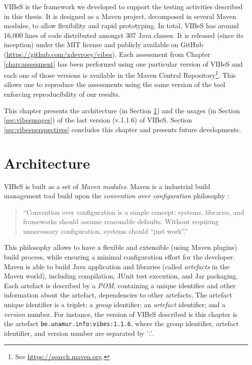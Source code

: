 

\gls{VIBeS} is the framework we developed to support the testing activities described in this thesis. It is designed as a Maven project, decomposed in several Maven modules, to allow flexibility and rapid prototyping. In total, \gls{VIBeS} has around 16,000 lines of code distributed amongst 307 Java classes. It is released (since its inception) under the MIT license and publicly available on GitHub (\url{https://github.com/xdevroey/vibes}). Each assessment from Chapter \ref{chap:assessment} has been performed using one particular version of \gls{VIBeS} and each one of those versions is available in the Maven Central Repository\footnote{See \url{https://search.maven.org}.}. This allows one to reproduce the assessments using the same version of the tool enforcing reproducibility of our results. 

This chapter presents the architecture (in Section \ref{sec:vibesarchitecture}) and the usages (in Section \ref{sec:vibesusages}) of the last version (v.1.1.6) of \gls{VIBeS}. Section \ref{sec:vibesperspectives} concludes this chapter and presents future developments.

\section{Architecture}

\label{sec:vibesarchitecture}

\gls{VIBeS} is built as a set of \emph{Maven modules}. Maven is a industrial build management tool build upon the \textit{convention over configuration} philosophy \cite{Sonatype2011}:
\begin{quote}
``Convention over configuration is a simple concept: systems, libraries, and frameworks should assume reasonable defaults. Without requiring unnecessary configuration, systems should ``just work''.''
\end{quote}
This philosophy allows to have a flexible and extensible (using Maven plugins) build process, while ensuring a minimal configuration effort for the developer. 
Maven is able to build Java application and libraries (called \emph{artefacts} in the Maven world), including compilation, JUnit test execution, and Jar packaging. Each artefact is described by a \emph{\gls{POM}}, containing a unique identifier and other information about the artefact, dependencies to other artefacts, \etc The artefact unique identifier is a triplet: a \emph{group} identifier; an \emph{artefact} identifier; and a \emph{version} number. For instance, the version of \gls{VIBeS} described is this chapter is the artefact \texttt{be.unamur.info:vibes:1.1.6}, where the group identifier, artefact identifier, and version number are separated by ':'.

